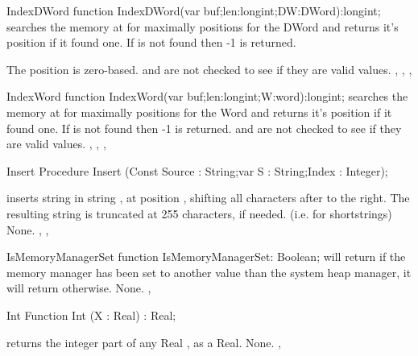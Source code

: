 
\begin{function}{IndexDWord}
\Declaration
function  IndexDWord(var buf;len:longint;DW:DWord):longint;
\Description
{} searches the memory at  for maximally 
positions for the DWord  and returns it's position if it found one.
If  is not found then -1 is returned.

The position is zero-based.
\Errors
{} and  are not checked to see if they are valid values.
\SeeAlso
{}, , , 
\end{function}


\begin{function}{IndexWord}
\Declaration
function  IndexWord(var buf;len:longint;W:word):longint;
\Description
{} searches the memory at  for maximally 
positions for the Word  and returns it's position if it found one.
If  is not found then -1 is returned.
\Errors
{} and  are not checked to see if they are valid values.
\SeeAlso
{}, , , 
\end{function}


\begin{procedure}{Insert}
\Declaration
Procedure Insert (Const Source : String;var S : String;Index : Integer);

\Description
{} inserts string  in string , at position
, shifting all characters after  to the right. The
resulting string is truncated at 255 characters, if needed. (i.e. for
shortstrings)
\Errors
None.
\SeeAlso
{}, , 
\end{procedure}


\begin{function}{IsMemoryManagerSet}
\Declaration
function  IsMemoryManagerSet: Boolean;
\Description
{} will return  if the memory manager has
been set to another value than the system heap manager, it will return
 otherwise.
\Errors
None.
\SeeAlso
{}, 
\end{function}

\begin{function}{Int}
\Declaration
Function Int (X : Real) : Real;

\Description
{} returns the integer part of any Real , as a Real.
\Errors
None.
\SeeAlso
{}, 
\end{function}

